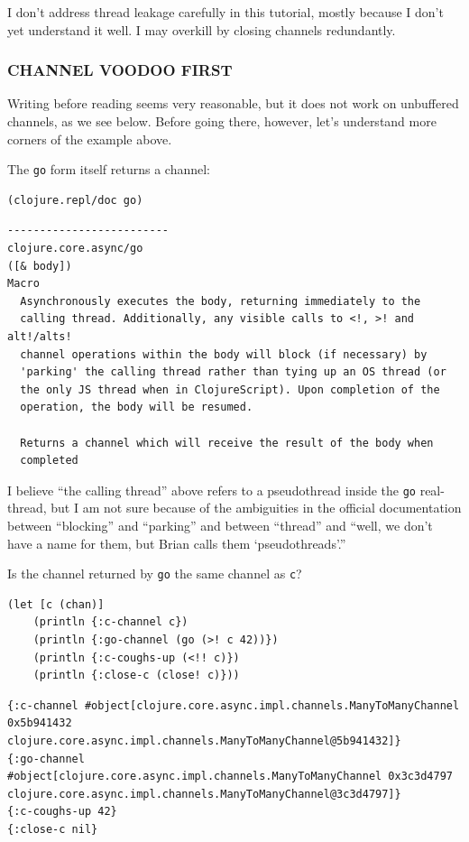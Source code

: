 \documentclass[10pt,oneside,x11names]{article}
\begin{document}
I don't address thread leakage carefully in this tutorial, mostly
because I don't yet understand it well. I may overkill by closing
channels redundantly.

\subsubsection{CHANNEL VOODOO FIRST}
\label{channel-voodoo-first}
Writing before reading seems very reasonable, but it does not work on
unbuffered channels, as we see below. Before going there, however, let's
understand more corners of the example above.

The \texttt{go} form itself returns a channel:

\begin{verbatim}
(clojure.repl/doc go)
\end{verbatim}

\begin{verbatim}
-------------------------
clojure.core.async/go
([& body])
Macro
  Asynchronously executes the body, returning immediately to the
  calling thread. Additionally, any visible calls to <!, >! and alt!/alts!
  channel operations within the body will block (if necessary) by
  'parking' the calling thread rather than tying up an OS thread (or
  the only JS thread when in ClojureScript). Upon completion of the
  operation, the body will be resumed.

  Returns a channel which will receive the result of the body when
  completed
\end{verbatim}

I believe ``the calling thread'' above refers to a pseudothread inside the
\texttt{go} real-thread, but I am not sure because of the ambiguities in the
official documentation between ``blocking'' and ``parking'' and between
``thread'' and ``well, we don't have a name for them, but Brian calls them
`pseudothreads'.''

Is the channel returned by \texttt{go} the same channel as \texttt{c}?

\begin{verbatim}
(let [c (chan)]
    (println {:c-channel c})
    (println {:go-channel (go (>! c 42))})
    (println {:c-coughs-up (<!! c)})
    (println {:close-c (close! c)}))
\end{verbatim}

\begin{verbatim}
{:c-channel #object[clojure.core.async.impl.channels.ManyToManyChannel 0x5b941432 clojure.core.async.impl.channels.ManyToManyChannel@5b941432]}
{:go-channel #object[clojure.core.async.impl.channels.ManyToManyChannel 0x3c3d4797 clojure.core.async.impl.channels.ManyToManyChannel@3c3d4797]}
{:c-coughs-up 42}
{:close-c nil}
\end{verbatim}
\end{document}
